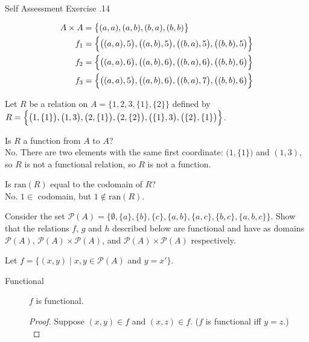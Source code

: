 \documentclass[\main/notes.tex]{subfiles}
\begin{document}
\begin{exercise}{Self Assessment Exercise \thechapter.14}
\begin{questions}
\begin{answer}
\begin{align*}
									A \times A &= \bigl\{(a, a), (a, b), (b, a), (b, b)\bigr\}\\
									f_{1} &= \Bigl\{\bigl((a, a), 5\bigr), \bigl((a, b), 5\bigr), \bigl((b, a), 5\bigr), \bigl((b, b), 5\bigr)\Bigr\}\\
									f_{2} &= \Bigl\{\bigl((a, a), 6\bigr), \bigl((a, b), 6\bigr), \bigl((b, a), 6\bigr), \bigl((b, b), 6\bigr)\Bigr\}\\
									f_{3} &= \Bigl\{\bigl((a, a), 5\bigr), \bigl((a, b), 6\bigr), \bigl((b, a), 7\bigr), \bigl((b, b), 6\bigr)\Bigr\}
								\end{align*}
							\end{answer}
						\item Let $R$ be a relation on $A = \bigl\{1, 2, 3, \{1\}, \{2\}\bigr\}$ defined by \\$R = \Bigl\{\bigl(1, \{1\}\bigr), \bigl(1, 3\bigr), \bigl(2, \{1\}\bigr), \bigl(2, \{2\}\bigr), \bigl(\{1\}, 3\bigr), \bigl(\{2\}, \{1\}\bigr)\Bigr\}$.
							\begin{questions}
								\item Is $R$ a function from $A$ to $A$?\\
									{\answer No. There are two elements with the same first coordinate: $\bigl(1, \{1\}\bigr)$ and $(1, 3)$, so $R$ is not a functional relation, so $R$ is not a function.}
								\item Is $\mathrm{ran}(R)$ equal to the codomain of $R$?\\
									{\answer No. $1 \in$ codomain, but $1 \notin \mathrm{ran}(R)$.}
							\end{questions}
						\pagebreak
						\item Consider the set $\mathcal{P}(A) = \bigl\{\emptyset, \{a\}, \{b\}, \{c\}, \{a, b\}, \{a, c\}, \{b, c\}, \{a, b, c\}\bigr\}$. Show that the relations $f$, $g$ and $h$ described below are functional and have as domains $\mathcal{P}(A)$, $\mathcal{P}(A) \times \mathcal{P}(A)$, and $\mathcal{P}(A) \times \mathcal{P}(A)$ respectively.
							\begin{questions}
								\item Let $f = \bigl\{(x, y) \mid x, y \in \mathcal{P}(A)$ and $y = x' \bigr\}$.
									\begin{answer}
										\begin{description}
											\item[Functional] $f$ is functional.
												\begin{proof}
													Suppose $(x, y) \in f$ and $(x, z) \in f$. ($f$ is functional iff $y = z$.)\\

\end{proof}
\end{description}
\end{answer}
\end{questions}
\end{questions}
\end{exercise}
\end{document}
